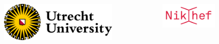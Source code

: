 \documentclass[usenames,dvipsnames,t]{beamer}
\begin{document}
{\begin{frame}
  \begin{columns}
  \begin{figure}
    \centering
    \vspace{1.5mm}
    \includegraphics[width=0.75\linewidth]{Figures/utrecht-university.png}
  \end{figure}
  \begin{figure}
    \centering
    \includegraphics[width=0.75\linewidth]{Figures/Nikhef_logo-transparent.png}
  \end{figure}
\end{columns}
  
  \end{frame}
}



\end{document}
